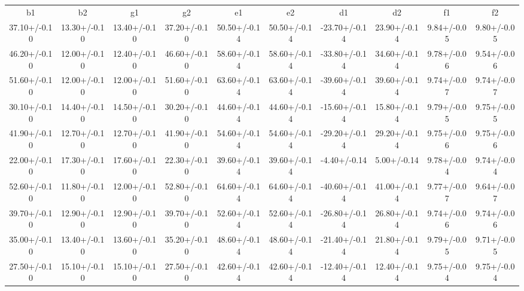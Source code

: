 \begin{table}
\begin{tabular}{cccccccccc}
b1 & b2 & g1 & g2 & e1 & e2 & d1 & d2 & f1 & f2 \\
37.10+/-0.10 & 13.30+/-0.10 & 13.40+/-0.10 & 37.20+/-0.10 & 50.50+/-0.14 & 50.50+/-0.14 & -23.70+/-0.14 & 23.90+/-0.14 & 9.84+/-0.05 & 9.80+/-0.05 \\
46.20+/-0.10 & 12.00+/-0.10 & 12.40+/-0.10 & 46.60+/-0.10 & 58.60+/-0.14 & 58.60+/-0.14 & -33.80+/-0.14 & 34.60+/-0.14 & 9.78+/-0.06 & 9.54+/-0.06 \\
51.60+/-0.10 & 12.00+/-0.10 & 12.00+/-0.10 & 51.60+/-0.10 & 63.60+/-0.14 & 63.60+/-0.14 & -39.60+/-0.14 & 39.60+/-0.14 & 9.74+/-0.07 & 9.74+/-0.07 \\
30.10+/-0.10 & 14.40+/-0.10 & 14.50+/-0.10 & 30.20+/-0.10 & 44.60+/-0.14 & 44.60+/-0.14 & -15.60+/-0.14 & 15.80+/-0.14 & 9.79+/-0.05 & 9.75+/-0.05 \\
41.90+/-0.10 & 12.70+/-0.10 & 12.70+/-0.10 & 41.90+/-0.10 & 54.60+/-0.14 & 54.60+/-0.14 & -29.20+/-0.14 & 29.20+/-0.14 & 9.75+/-0.06 & 9.75+/-0.06 \\
22.00+/-0.10 & 17.30+/-0.10 & 17.60+/-0.10 & 22.30+/-0.10 & 39.60+/-0.14 & 39.60+/-0.14 & -4.40+/-0.14 & 5.00+/-0.14 & 9.78+/-0.04 & 9.74+/-0.04 \\
52.60+/-0.10 & 11.80+/-0.10 & 12.00+/-0.10 & 52.80+/-0.10 & 64.60+/-0.14 & 64.60+/-0.14 & -40.60+/-0.14 & 41.00+/-0.14 & 9.77+/-0.07 & 9.64+/-0.07 \\
39.70+/-0.10 & 12.90+/-0.10 & 12.90+/-0.10 & 39.70+/-0.10 & 52.60+/-0.14 & 52.60+/-0.14 & -26.80+/-0.14 & 26.80+/-0.14 & 9.74+/-0.06 & 9.74+/-0.06 \\
35.00+/-0.10 & 13.40+/-0.10 & 13.60+/-0.10 & 35.20+/-0.10 & 48.60+/-0.14 & 48.60+/-0.14 & -21.40+/-0.14 & 21.80+/-0.14 & 9.79+/-0.05 & 9.71+/-0.05 \\
27.50+/-0.10 & 15.10+/-0.10 & 15.10+/-0.10 & 27.50+/-0.10 & 42.60+/-0.14 & 42.60+/-0.14 & -12.40+/-0.14 & 12.40+/-0.14 & 9.75+/-0.04 & 9.75+/-0.04 \\
\end{tabular}
\end{table}
